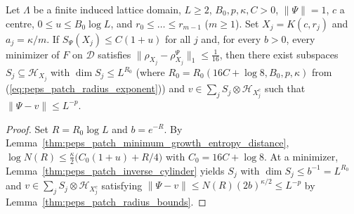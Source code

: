\begin{lemma}
    \label{lem:peps_closed_square_cylinder_core}
    \leanok
    Let $\Lambda$ be a finite induced lattice domain, $L\ge2$, $B_0,p,\kappa,C>0$,
    $\|\Psi\|=1$, $c$ a centre, $0\le u\le B_0\log L$, and
    $r_0\le\dots\le r_{m-1}$ ($m\ge1$). Set $X_j=K(c,r_j)$ and
    $a_j=\kappa/m$. If $S_\Psi(X_j)\le C(1+u)$ for all $j$ and, for every $b>0$, every minimizer of $F$ on $\mathcal D$ satisfies $\|\rho_{X_j}-\rho_{X_j}^\Psi\|_1\le\tfrac1{16}$, then there exist
    subspaces $S_j\subseteq\mathcal H_{X_j}$ with $\dim S_j\le L^{R_0}$ (where $R_0=R_0(16C+\log8,B_0,p,\kappa)$ from (\ref{eq:peps_patch_radius_exponent})) and $v\in\sum_j S_j\otimes\mathcal H_{X_j^c}$ such that $\|\Psi-v\|\le L^{-p}$.
\end{lemma}
\begin{proof}
    \leanok
    Set $R=R_0\log L$ and $b=e^{-R}$. By Lemma~\ref{thm:peps_patch_minimum_growth_entropy_distance}, $\log N(R)\le\frac\kappa2\bigl(C_0(1+u)+R/4\bigr)$ with $C_0=16C+\log8$. At a minimizer, Lemma~\ref{thm:peps_patch_inverse_cylinder} yields $S_j$ with $\dim S_j\le b^{-1}=L^{R_0}$ and $v\in\sum_j S_j\otimes\mathcal H_{X_j^c}$ satisfying $\|\Psi-v\|\le N(R)(2b)^{\kappa/2}\le L^{-p}$ by Lemma~\ref{thm:peps_patch_radius_bounds}.
\end{proof}

